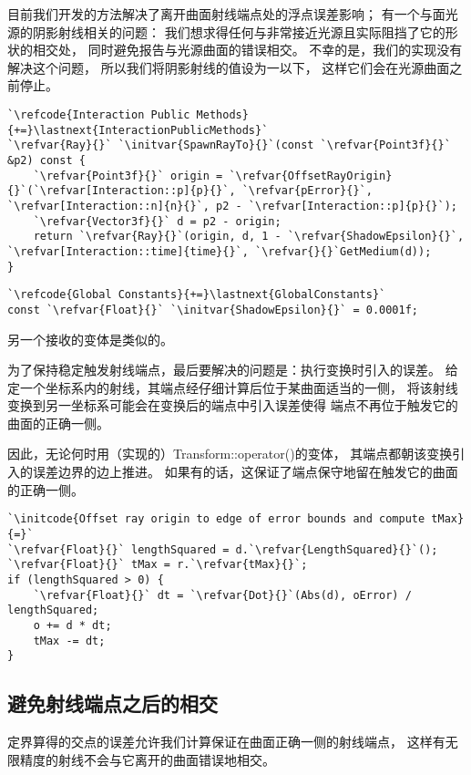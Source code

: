 目前我们开发的方法解决了离开曲面射线端点处的浮点误差影响；
有一个与面光源的阴影射线相关的问题：
我们想求得任何与非常接近光源且实际阻挡了它的形状的相交处，
同时避免报告与光源曲面的错误相交。
不幸的是，我们的实现没有解决这个问题，
所以我们将阴影射线的值设为一以下，
这样它们会在光源曲面之前停止。
\begin{lstlisting}
`\refcode{Interaction Public Methods}{+=}\lastnext{InteractionPublicMethods}`
`\refvar{Ray}{}` `\initvar{SpawnRayTo}{}`(const `\refvar{Point3f}{}` &p2) const {
    `\refvar{Point3f}{}` origin = `\refvar{OffsetRayOrigin}{}`(`\refvar[Interaction::p]{p}{}`, `\refvar{pError}{}`, `\refvar[Interaction::n]{n}{}`, p2 - `\refvar[Interaction::p]{p}{}`);
    `\refvar{Vector3f}{}` d = p2 - origin;
    return `\refvar{Ray}{}`(origin, d, 1 - `\refvar{ShadowEpsilon}{}`, `\refvar[Interaction::time]{time}{}`, `\refvar{}{}`GetMedium(d));
}
\end{lstlisting}
\begin{lstlisting}
`\refcode{Global Constants}{+=}\lastnext{GlobalConstants}`
const `\refvar{Float}{}` `\initvar{ShadowEpsilon}{}` = 0.0001f;
\end{lstlisting}

另一个接收的变体是类似的。

为了保持稳定触发射线端点，最后要解决的问题是：执行变换时引入的误差。
给定一个坐标系内的射线，其端点经仔细计算后位于某曲面适当的一侧，
将该射线变换到另一坐标系可能会在变换后的端点中引入误差使得
端点不再位于触发它的曲面的正确一侧。

因此，无论何时用（实现的）{\ttfamily Transform::operator()}的变体，
其端点都朝该变换引入的误差边界的边上推进。
如果有的话，这保证了端点保守地留在触发它的曲面的正确一侧。
\begin{lstlisting}
`\initcode{Offset ray origin to edge of error bounds and compute tMax}{=}`
`\refvar{Float}{}` lengthSquared = d.`\refvar{LengthSquared}{}`();
`\refvar{Float}{}` tMax = r.`\refvar{tMax}{}`;
if (lengthSquared > 0) {
    `\refvar{Float}{}` dt = `\refvar{Dot}{}`(Abs(d), oError) / lengthSquared;
    o += d * dt;
    tMax -= dt;
}
\end{lstlisting}

\subsection{避免射线端点之后的相交}\label{sub:避免射线端点之后的相交}
定界算得的交点的误差允许我们计算保证在曲面正确一侧的射线端点，
这样有无限精度的射线不会与它离开的曲面错误地相交。